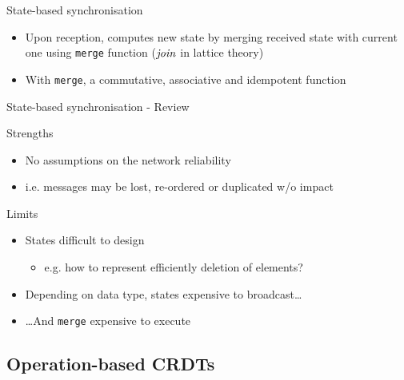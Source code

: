 \begin{frame}{State-based synchronisation}
\begin{figure}[!ht]
{
        }
    \end{figure}

    \begin{itemize}
        \item<3-> Upon reception, \alert{computes new state by merging received state with current one} using \texttt{merge} function  ($\mathit{join}$ in lattice theory)
        \item<5-> With \texttt{merge}, a \alert{commutative, associative and idempotent function}
    \end{itemize}
\end{frame}

\begin{frame}{State-based synchronisation - Review}

    \begin{block}{Strengths}
        \begin{itemize}
            \item No assumptions on the network reliability
            \item i.e. messages may be lost, re-ordered or duplicated w/o impact
        \end{itemize}
    \end{block}
    \pause
    \begin{block}{Limits}
        \begin{itemize}
            \item States difficult to design
            \begin{itemize}
                \item e.g. how to represent efficiently deletion of elements?
            \end{itemize}
            \pause
            \item Depending on data type, states expensive to broadcast\dots
            \item \dots And \texttt{merge} expensive to execute
        \end{itemize}
    \end{block}
\end{frame}

\subsection{Operation-based CRDTs}

